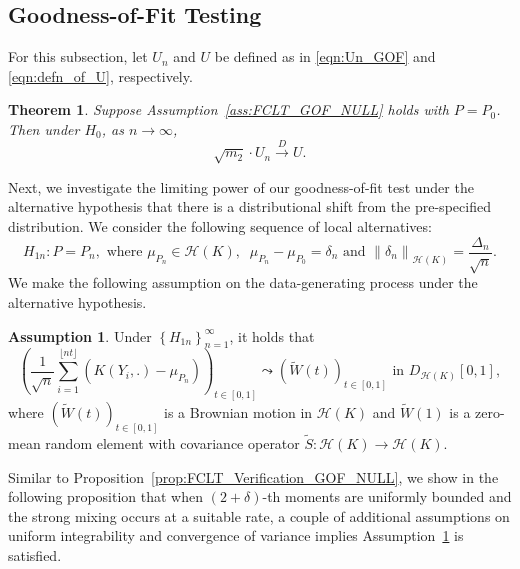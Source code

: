 \documentclass[11pt]{article}
\theoremstyle{plain}
\newtheorem{theorem}{Theorem}[section]
\theoremstyle{definition}
\newtheorem{assumption}{Assumption}
\theoremstyle{remark}
\begin{document}
\subsection{Goodness-of-Fit Testing}
For this subsection, let $U_n$ and $U$ be defined as in \eqref{eqn:Un_GOF} and \eqref{eqn:defn_of_U}, respectively.
\begin{theorem}\label{thm:asymp_null_GOF}
    Suppose Assumption~\ref{ass:FCLT_GOF_NULL} holds with $P=P_0$. Then under $H_0$, as $n \to \infty$,
    $$\sqrt{m_2}\cdot U_n\overset{D}{\to}U.$$
\end{theorem}
Next, we investigate the limiting power of our goodness-of-fit test under the alternative hypothesis that there is a distributional shift from the pre-specified distribution. We consider the following sequence of local alternatives:
$$H_{1n}:P=P_n,\text{ where }\mu_{P_n}\in \mathcal{H}(K),\;\;\mu_{P_n}-\mu_{P_0}=\delta_n\text{ and }\left\|\delta_n\right\|_{\mathcal{H}(K)}=\frac{\Delta_n}{\sqrt{n}}.$$
We make the following assumption on the data-generating process under the alternative hypothesis.
\begin{assumption}\label{ass:FCLT_local_alternative_GOF}
   Under $\left\{H_{1n}\right\}_{n=1}^{\infty}$, it holds that
    \begin{equation}
    \left(\frac{1}{\sqrt{n}} \sum_{i=1}^{\lfloor n t\rfloor}\left(K(Y_i,.)-\mu_{P_n}\right)\right)_{t \in[0,1]} \leadsto (\tilde{W}(t))_{t \in[0,1]}\text{ in } D_{\mathcal{H}(K)}[0,1],
\end{equation}
where $(\tilde{W}(t))_{t \in[0,1]}$ is a Brownian motion in $\mathcal{H}(K)$ and $\tilde{W}(1)$ is a zero-mean random element with covariance operator $\tilde{S}: \mathcal{H}(K) \rightarrow \mathcal{H}(K)$.
\end{assumption}
Similar to Proposition~\ref{prop:FCLT_Verification_GOF_NULL}, we show in the following proposition that when $(2+\delta)$-th moments are uniformly bounded and the strong mixing occurs at a suitable rate, a couple of additional assumptions on uniform integrability and convergence of variance implies Assumption~\ref{ass:FCLT_local_alternative_GOF} is satisfied.
\end{document}
